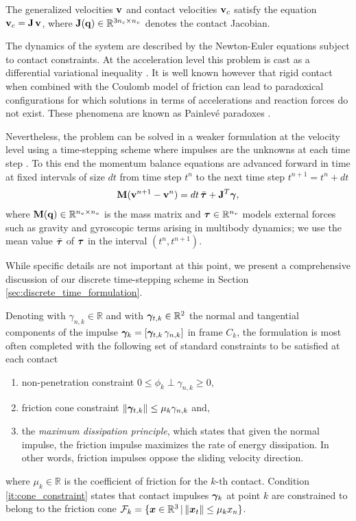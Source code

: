 The generalized velocities ${\mathbf{v}}$ and contact velocities ${\mathbf{v}}_c$ satisfy
the equation ${\mathbf{v}}_c={\mathbf{J}}\,{\mathbf{v}}$, where
${\mathbf{J}}({\mathbf{q}})\in\mathbb{R}^{3n_c\times n_v}$ denotes the contact Jacobian.

The dynamics of the system are described by the Newton-Euler equations subject
to contact constraints. At the acceleration level this problem is cast as a
differential variational inequality \cite{bib:pang2008differential}. It is well
known however \cite{bib:baraff1993issues} that rigid contact when combined with
the Coulomb model of friction can lead to paradoxical configurations for which
solutions in terms of accelerations and reaction forces do not exist. These
phenomena are known as Painlev\'e paradoxes \cite{bib:hogan2017regularization}.

Nevertheless, the problem can be solved in a weaker formulation at the velocity
level using a time-stepping scheme where impulses are the unknowns at each time
step \cite{bib:stewart1998convergence}. To this end the momentum balance
equations are advanced forward in time at fixed intervals of size $dt$ from time
step $t^n$ to the next time step $t^{n+1}=t^n+dt$
\begin{eqnarray}
	\mf{M}(\mf{v}^{n+1}-\mf{v}^n)  = dt\,\bar{\vf{\tau}} + \mf{J}^T\mf{\bgamma},
	\label{eq:momentum_balance}
\end{eqnarray}
where ${\mathbf{M}}({\mathbf{q}})\in\mathbb{R}^{n_v\times n_v}$ is the mass matrix and
${\bm{\tau}}\in\mathbb{R}^{n_v}$ models external forces such as gravity and
gyroscopic terms arising in multibody dynamics; we use the mean value
$\bar{{\bm{\tau}}}$ of ${{\bm{\tau}}}$ in the interval $(t^n,t^{n+1})$.

While specific details are not
important at this point, we present a comprehensive discussion of our discrete
time-stepping scheme in Section \ref{sec:discrete_time_formulation}.

Denoting with $\gamma_{n,k} \in \mathbb{R}$ and with ${\bm\gamma}_{t,k} \in
\mathbb{R}^2$ the normal and tangential components of the impulse
${\bm\gamma}_k=[{\bm\gamma}_{t,k}\,\gamma_{n,k}]$ in frame $C_k$, the formulation is
most often completed with the following set of standard constraints to be
satisfied at each contact
\begin{enumerate}
	\item non-penetration constraint $0\le\phi_k\perp\gamma_{n,k}\ge0$,
	\item\label{it:cone_constraint} friction cone constraint
	$\Vert{\bm\gamma}_{t,k}\Vert\le \mu_k\gamma_{n,k}$ and,
	\item the \emph{maximum dissipation principle}, which states that given the
	normal impulse, the friction impulse maximizes the rate of energy
	dissipation. In other words, friction impulses oppose the sliding velocity
	direction.
\end{enumerate}
where $\mu_k \in \mathbb{R}$ is the coefficient of friction for the $k\text{-th}$ contact.
Condition \ref{it:cone_constraint} states that contact impulses ${\bm\gamma}_k$ at point $k$ are
constrained to belong to the friction cone
$\mathcal{F}_k=\{{\bm{x}}\in\mathbb{R}^3 \,|\, \Vert{\bm{x}}_t\Vert\le \mu_k x_n\}$.

